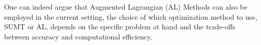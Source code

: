 \begin{itemize}
One can indeed argue that Augmented Lagrangian (AL) \cite{fortin2000augmented} Methods can also be employed in the current setting, the choice of which optimization method to use, SUMT or AL, depends on the specific problem at hand and the trade-offs between accuracy and computational efficiency.



	





\end{itemize}

